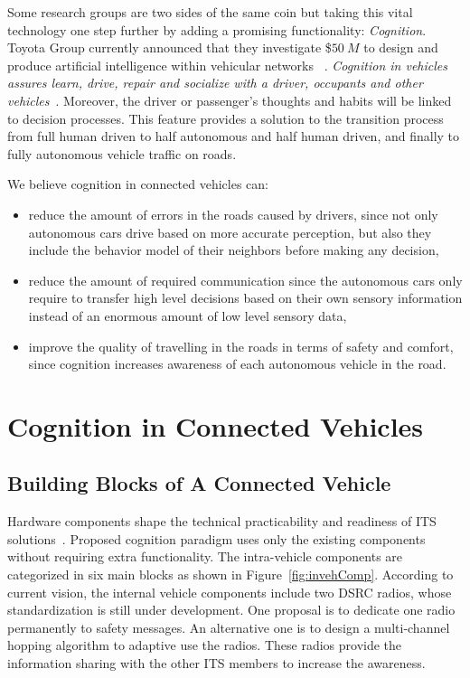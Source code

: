\documentclass[journal, 11pt]{IEEEtran}
\begin{document}
Some research groups are two sides of the same coin but taking this vital
technology one step further by adding a promising functionality:
\textit{Cognition}. Toyota Group currently announced that they investigate
\$$50~M$ to design and produce artificial intelligence within vehicular networks
~\cite{toyota50M}. \textit{Cognition in vehicles assures learn, drive, repair
and socialize with a driver, occupants and other vehicles}~\cite{cogcar}.
Moreover, the driver or passenger's thoughts and habits will be linked to
decision processes. This feature provides a solution to the transition process
from full human driven to half autonomous and half human driven, and finally to
fully autonomous vehicle traffic on roads.

We believe cognition in connected vehicles can:

\begin{itemize}
  \item reduce the amount of errors in the roads caused by drivers, since not
  only autonomous cars drive based on more accurate perception, but also they
  include the behavior model of their neighbors before making any decision,
  \item reduce the amount of required communication since the autonomous cars
  only require to transfer high level decisions based on their own sensory
  information instead of an enormous amount of low level sensory data,
  \item improve the quality of travelling in the roads in terms of safety and
  comfort, since cognition increases awareness of each autonomous vehicle in the
  road.
\end{itemize} 

\section{Cognition in Connected Vehicles}

\subsection{Building Blocks of A Connected Vehicle}

Hardware components shape the technical practicability and readiness of ITS
solutions~\cite{hardingNHTSA14}. Proposed cognition paradigm uses only the
existing components without requiring extra functionality. The intra-vehicle
components are categorized in six main blocks as shown in
Figure~\ref{fig:invehComp}. According to current vision, the internal vehicle
components include two DSRC radios, whose standardization is still under
development. One proposal is to dedicate one radio permanently to safety
messages. An alternative one is to design a multi-channel hopping algorithm to
adaptive use the radios. These radios provide the information sharing with the
other ITS members to increase the awareness.
\end{document}

